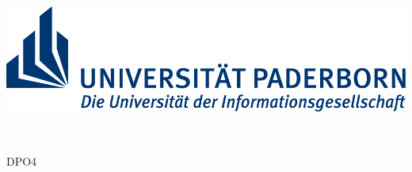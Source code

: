 \begin{titlepage}
\selectfont

\vspace*{-0.75cm}

\begin{minipage}[t]{0.3\linewidth}
\begin{flushleft}
\begin{center}
 \includegraphics[scale=0.75]{images/Logo_Uni_Paderborn.pdf}
\end{center}

\end{flushleft}
\end{minipage}

\vspace{1.0cm}

\begin{center}
\begin{Large}\thesistype \end{Large}  \\
\begin{normalsize}DPO4 \end{normalsize} \bigskip \\
\dmseries\huge{\thesistitle \\ \thesissubtitle}
\end{center}

\vspace{0.4cm}
\renewcommand{\bigskip}{\vspace*{0.43cm}}


\end{titlepage}
